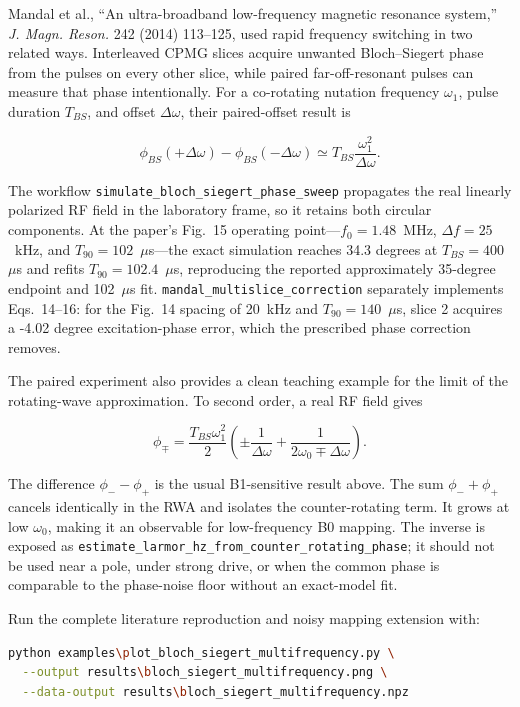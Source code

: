 \documentclass[11pt,oneside]{report}
\newcommand{\code}[1]{\texttt{#1}}
\begin{document}
Mandal et al., ``An ultra-broadband low-frequency magnetic resonance system,''
\emph{J. Magn. Reson.} 242 (2014) 113--125, used rapid frequency switching in
two related ways. Interleaved CPMG slices acquire unwanted Bloch--Siegert phase
from the pulses on every other slice, while paired far-off-resonant pulses can
measure that phase intentionally. For a co-rotating nutation frequency
\(\omega_1\), pulse duration \(T_{BS}\), and offset \(\Delta\omega\), their
paired-offset result is

\[
 \phi_{BS}(+\Delta\omega)-\phi_{BS}(-\Delta\omega)
 \simeq T_{BS}\frac{\omega_1^2}{\Delta\omega}.
\]

The workflow \code{simulate\_bloch\_siegert\_phase\_sweep} propagates the real
linearly polarized RF field in the laboratory frame, so it retains both circular
components. At the paper's Fig.~15 operating point---\(f_0=1.48\)~MHz,
\(\Delta f=25\)~kHz, and \(T_{90}=102\)~\(\mu\)s---the exact simulation reaches
34.3 degrees at \(T_{BS}=400\)~\(\mu\)s and refits \(T_{90}=102.4\)~\(\mu\)s,
reproducing the reported approximately 35-degree endpoint and 102~\(\mu\)s fit.
\code{mandal\_multislice\_correction} separately implements Eqs.~14--16: for
the Fig.~14 spacing of 20~kHz and \(T_{90}=140\)~\(\mu\)s, slice 2 acquires a
-4.02 degree excitation-phase error, which the prescribed phase correction
removes.

The paired experiment also provides a clean teaching example for the limit of
the rotating-wave approximation. To second order, a real RF field gives

\[
 \phi_{\mp} = \frac{T_{BS}\omega_1^2}{2}
 \left(\pm\frac{1}{\Delta\omega}
       +\frac{1}{2\omega_0\mp\Delta\omega}\right).
\]

The difference \(\phi_- - \phi_+\) is the usual B1-sensitive result above. The
sum \(\phi_- + \phi_+\) cancels identically in the RWA and isolates the
counter-rotating term. It grows at low \(\omega_0\), making it an observable for
low-frequency B0 mapping. The inverse is exposed as
\code{estimate\_larmor\_hz\_from\_counter\_rotating\_phase}; it should not be
used near a pole, under strong drive, or when the common phase is comparable to
the phase-noise floor without an exact-model fit.

Run the complete literature reproduction and noisy mapping extension with:

\begin{lstlisting}[language=bash]
python examples\plot_bloch_siegert_multifrequency.py \
  --output results\bloch_siegert_multifrequency.png \
  --data-output results\bloch_siegert_multifrequency.npz
\end{lstlisting}
\end{document}
